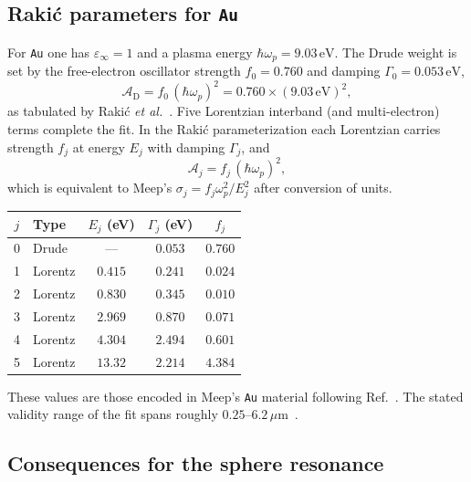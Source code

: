 \documentclass[11pt,a4paper]{article}
\begin{document}
\subsection{Raki\'{c} parameters for \texttt{Au}}

For \texttt{Au} one has $\varepsilon_\infty=1$ and a plasma energy
$\hbar\omega_p=9.03\,\mathrm{eV}$.  The Drude weight is set by the free-electron
oscillator strength $f_0=0.760$ and damping $\Gamma_0=0.053\,\mathrm{eV}$,
\begin{equation}
  \mathcal{A}_{\mathrm{D}}
  =
  f_0\,(\hbar\omega_p)^2
  =
  0.760\times(9.03\,\mathrm{eV})^2,
\end{equation}
as tabulated by Raki\'{c} \emph{et al.}~\citep{rakic1998}.
Five Lorentzian interband (and multi-electron) terms complete the fit.  In the
Raki\'{c} parameterization each Lorentzian carries strength $f_j$ at energy
$E_j$ with damping $\Gamma_j$, and
\begin{equation}
  \mathcal{A}_j = f_j\,(\hbar\omega_p)^2,
\end{equation}
which is equivalent to Meep's $\sigma_j=f_j\omega_p^2/E_j^2$ after conversion of
units.
\begin{center}
\begin{tabular}{@{}clccc@{}}
\toprule
$j$ & Type & $E_j$ (eV) & $\Gamma_j$ (eV) & $f_j$ \\
\midrule
0 & Drude   & ---   & $0.053$ & $0.760$ \\
1 & Lorentz & $0.415$ & $0.241$ & $0.024$ \\
2 & Lorentz & $0.830$ & $0.345$ & $0.010$ \\
3 & Lorentz & $2.969$ & $0.870$ & $0.071$ \\
4 & Lorentz & $4.304$ & $2.494$ & $0.601$ \\
5 & Lorentz & $13.32$ & $2.214$ & $4.384$ \\
\bottomrule
\end{tabular}
\end{center}

\noindent
These values are those encoded in Meep's \texttt{Au} material following
Ref.~.  The stated validity range of the fit spans roughly
$0.25$--$6.2\,\mu\mathrm{m}$~\citep{rakic1998}.

\subsection{Consequences for the sphere resonance}
\end{document}
